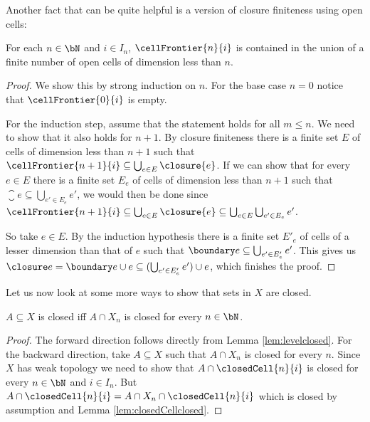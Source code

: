 Another fact that can be quite helpful is a version of closure finiteness using open cells:

\begin{lem} \label{lem:Frontiersubsetopen}
    For each $n \in \bN$ and $i \in I_n$, $\cellFrontier{n}{i}$ is contained in the union of a finite number of open cells of dimension less than $n$.
    \href{https://github.com/scholzhannah/CWComplexes/blob/7be4872a05b534011cc969eb5b80a4b7f0bf57e2/CWcomplexes/Definition.lean#L420-L452}{\faExternalLink}
\end{lem}
\begin{proof}
    We show this by strong induction on $n$.
    For the base case $n = 0$ notice that $\cellFrontier{0}{i}$ is empty.

    For the induction step, assume that the statement holds for all $m \le n$.
    We need to show that it also holds for $n + 1$.
    By closure finiteness there is a finite set $E$ of cells of dimension less than $n + 1$ such that $\cellFrontier{n + 1}{i} \subseteq \bigcup_{e \in E}\closure{e}$.
    If we can show that for every $e \in E$ there is a finite set $E_e$ of cells of dimension less than $n + 1$ such that $\closure{e} \subseteq \bigcup_{e' \in E_e}e'$, we would then be done since $\cellFrontier{n + 1}{i} \subseteq \bigcup_{e \in E}\closure{e} \subseteq \bigcup_{e \in E}\bigcup_{e' \in E_e}e'$.

    So take $e \in E$.
    By the induction hypothesis there is a finite set $E'_e$ of cells of a lesser dimension than that of $e$ such that $\boundary e \subseteq \bigcup_{e' \in E'_e}e'$.
    This gives us $\closure e = \boundary e \cup e \subseteq (\bigcup_{e' \in E'_e}e') \cup e$, which finishes the proof.
\end{proof}

Let us now look at some more ways to show that sets in $X$ are closed. 

\begin{lem}\label{lem:closediffskeleton}
    $A \subseteq X$ is closed iff $A \cap X_n$ is closed for every $n \in \bN$. \href{https://github.com/scholzhannah/CWComplexes/blob/7be4872a05b534011cc969eb5b80a4b7f0bf57e2/CWcomplexes/Lemmas.lean#L29-L36}{\faExternalLink}
\end{lem}
\begin{proof}
    The forward direction follows directly from Lemma \ref{lem:levelclosed}. 
    For the backward direction, take $A \subseteq X$ such that $A \cap X_n$ is closed for every $n$.
    Since $X$ has weak topology we need to show that $A \cap \closedCell{n}{i}$ is closed for every $n \in \bN$ and $i \in I_n$. 
    But $A \cap \closedCell{n}{i} = A \cap X_n \cap \closedCell{n}{i}$ which is closed by assumption and Lemma \ref{lem:closedCellclosed}.
\end{proof}

